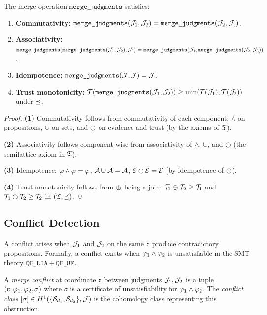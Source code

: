 \documentclass[11pt]{article}
\newcommand{\MergeOp}{\texttt{merge\_judgments}}
\begin{document}
\begin{theorem}\label{thm:merge-props}
The merge operation $\MergeOp$ satisfies:
\begin{enumerate}
  \item \textbf{Commutativity:} $\MergeOp(\J_1, \J_2) = \MergeOp(\J_2, \J_1)$.
  \item \textbf{Associativity:}
        $\MergeOp(\MergeOp(\J_1, \J_2), \J_3) =
         \MergeOp(\J_1, \MergeOp(\J_2, \J_3))$.
  \item \textbf{Idempotence:} $\MergeOp(\J, \J) = \J$.
  \item \textbf{Trust monotonicity:}
        $\trust(\MergeOp(\J_1, \J_2)) \geq \min(\trust(\J_1), \trust(\J_2))$
        under $\preceq$.
\end{enumerate}
\end{theorem}

\begin{proof}
\textbf{(1)} Commutativity follows from commutativity of each component:
$\wedge$ on propositions, $\cup$ on sets, and
$\oplus$ on evidence and trust (by the axioms of $\mathfrak{T}$).

\textbf{(2)} Associativity follows component-wise from associativity of
$\wedge$, $\cup$, and $\oplus$ (the semilattice axiom in $\mathfrak{T}$).

\textbf{(3)} Idempotence: $\varphi \wedge \varphi = \varphi$,
$\mathcal{A} \cup \mathcal{A} = \mathcal{A}$,
$\mathcal{E} \oplus \mathcal{E} = \mathcal{E}$ (by idempotence of $\oplus$).

\textbf{(4)} Trust monotonicity follows from $\oplus$ being a join:
$\mathcal{T}_1 \oplus \mathcal{T}_2 \geq \mathcal{T}_1$ and
$\mathcal{T}_1 \oplus \mathcal{T}_2 \geq \mathcal{T}_2$ in $(\mathfrak{T}, \preceq)$. \qed
\end{proof}

\subsection{Conflict Detection}

A conflict arises when $\mathcal{J}_1$ and $\mathcal{J}_2$ on the same $\mathsf{c}$ produce
contradictory propositions. Formally, a conflict exists when
$\varphi_1 \wedge \varphi_2$ is unsatisfiable in the SMT theory $\texttt{QF\_LIA} + \texttt{QF\_UF}$.

\begin{definition}
A \emph{merge conflict} at coordinate $\mathsf{c}$ between judgments $\mathcal{J}_1, \mathcal{J}_2$
is a tuple $(\mathsf{c}, \varphi_1, \varphi_2, \sigma)$ where $\sigma$ is a certificate
of unsatisfiability for $\varphi_1 \wedge \varphi_2$. The \emph{conflict class}
$[\sigma] \in H^{1}(\{\mathcal{S}_{d_1}, \mathcal{S}_{d_2}\}, \mathcal{J})$ is the cohomology
class representing this obstruction.
\end{definition}
\end{document}
